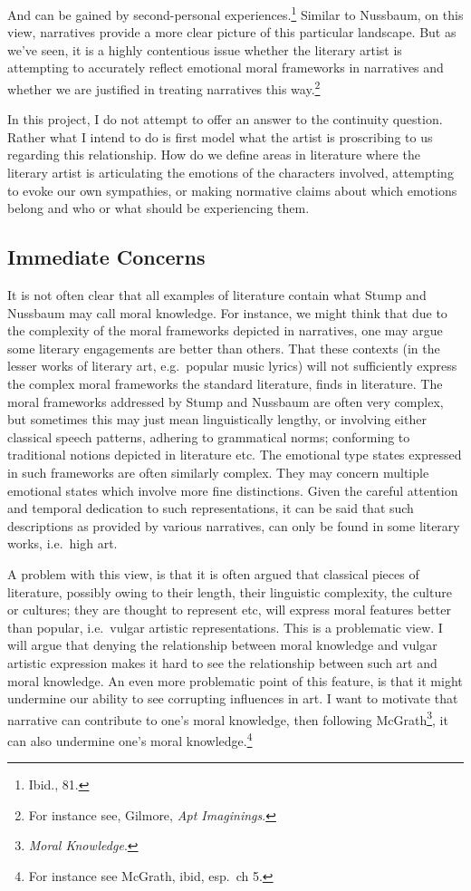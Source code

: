 \documentclass[
  12pt,
]{book}
\theoremstyle{definition}
\theoremstyle{definition}
\theoremstyle{definition}
\theoremstyle{definition}
\theoremstyle{remark}
\begin{document}
\noindent And can be gained by second-personal experiences.\footnote{Ibid., 81.} Similar to Nussbaum, on this view, narratives provide a more clear picture of this particular landscape. But as we've seen, it is a highly contentious issue whether the literary artist is attempting to accurately reflect emotional moral frameworks in narratives and whether we are justified in treating narratives this way.\footnote{For instance see, Gilmore, \emph{Apt {Imaginings}}.}

\noindent In this project, I do not attempt to offer an answer to the continuity question. Rather what I intend to do is first model what the artist is proscribing to us regarding this relationship. How do we define areas in literature where the literary artist is articulating the emotions of the characters involved, attempting to evoke our own sympathies, or making normative claims about which emotions belong and who or what should be experiencing them.

\subsection*{Immediate Concerns}\label{immediate-concerns}

It is not often clear that all examples of literature contain what Stump and Nussbaum may call moral knowledge. For instance, we might think that due to the complexity of the moral frameworks depicted in narratives, one may argue some literary engagements are better than others. That these contexts (in the lesser works of literary art, e.g.~popular music lyrics) will not sufficiently express the complex moral frameworks the standard literature, finds in literature. The moral frameworks addressed by Stump and Nussbaum are often very complex, but sometimes this may just mean linguistically lengthy, or involving either classical speech patterns, adhering to grammatical norms; conforming to traditional notions depicted in literature etc. The emotional type states expressed in such frameworks are often similarly complex. They may concern multiple emotional states which involve more fine distinctions. Given the careful attention and temporal dedication to such representations, it can be said that such descriptions as provided by various narratives, can only be found in some literary works, i.e.~high art.

A problem with this view, is that it is often argued that classical pieces of literature, possibly owing to their length, their linguistic complexity, the culture or cultures; they are thought to represent etc, will express moral features better than popular, i.e.~vulgar artistic representations. This is a problematic view. I will argue that denying the relationship between moral knowledge and vulgar artistic expression makes it hard to see the relationship between such art and moral knowledge. An even more problematic point of this feature, is that it might undermine our ability to see corrupting influences in art. I want to motivate that narrative can contribute to one's moral knowledge, then following McGrath\footnote{\emph{Moral {Knowledge}}.}, it can also undermine one's moral knowledge.\footnote{For instance see McGrath, ibid, esp.~ch 5.}
\end{document}
